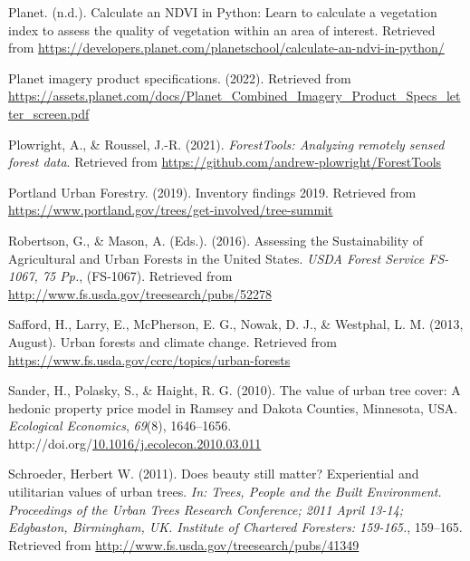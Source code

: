 \documentclass[12pt,twoside]{reedthesis}
\newlength{\cslhangindent}
\newenvironment{CSLReferences}[2] %
 {%
  \setlength{\parindent}{0pt}
  \ifodd #1 \everypar{\setlength{\hangindent}{\cslhangindent}}\ignorespaces\fi
  \ifnum #2 > 0
  \setlength{\parskip}{#2\baselineskip}
  \fi
 }%
 {}
\begin{document}
\begin{CSLReferences}{1}{0}
\leavevmode{}%
Planet. (n.d.). Calculate an NDVI in Python: Learn to calculate a vegetation index to assess the quality of vegetation within an area of interest. Retrieved from \url{https://developers.planet.com/planetschool/calculate-an-ndvi-in-python/}

\leavevmode{}%
Planet imagery product specifications. (2022). Retrieved from \url{https://assets.planet.com/docs/Planet_Combined_Imagery_Product_Specs_letter_screen.pdf}

\leavevmode{}%
Plowright, A., \& Roussel, J.-R. (2021). \emph{ForestTools: Analyzing remotely sensed forest data}. Retrieved from \url{https://github.com/andrew-plowright/ForestTools}

\leavevmode{}%
Portland Urban Forestry. (2019). Inventory findings 2019. Retrieved from \url{https://www.portland.gov/trees/get-involved/tree-summit}

\leavevmode{}%
Robertson, G., \& Mason, A. (Eds.). (2016). Assessing the Sustainability of Agricultural and Urban Forests in the United States. \emph{USDA Forest Service FS-1067, 75 Pp.}, (FS-1067). Retrieved from \url{http://www.fs.usda.gov/treesearch/pubs/52278}

\leavevmode{}%
Safford, H., Larry, E., McPherson, E. G., Nowak, D. J., \& Westphal, L. M. (2013, August). Urban forests and climate change. Retrieved from \url{https://www.fs.usda.gov/ccrc/topics/urban-forests}

\leavevmode{}%
Sander, H., Polasky, S., \& Haight, R. G. (2010). The value of urban tree cover: A hedonic property price model in Ramsey and Dakota Counties, Minnesota, USA. \emph{Ecological Economics}, \emph{69}(8), 1646--1656. http://doi.org/\href{https://doi.org/10.1016/j.ecolecon.2010.03.011}{10.1016/j.ecolecon.2010.03.011}

\leavevmode{}%
Schroeder, Herbert W. (2011). Does beauty still matter? Experiential and utilitarian values of urban trees. \emph{In: Trees, People and the Built Environment. Proceedings of the Urban Trees Research Conference; 2011 April 13-14; Edgbaston, Birmingham, UK. Institute of Chartered Foresters: 159-165.}, 159--165. Retrieved from \url{http://www.fs.usda.gov/treesearch/pubs/41349}


\end{CSLReferences}
\end{document}
